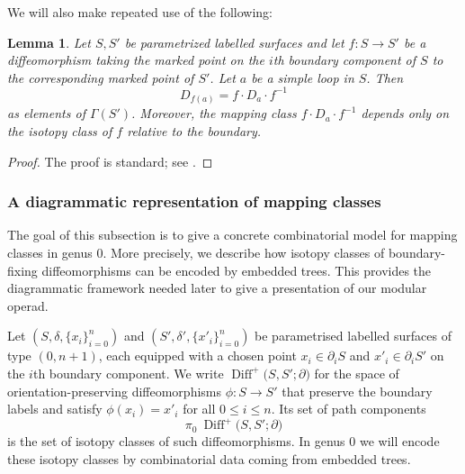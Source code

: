\documentclass{amsart}
\newcommand{\Diff}{\operatorname{Diff}}
\newtheorem{lemma}[theorem]{Lemma}%
\theoremstyle{definition}
\numberwithin{equation}{section}
\begin{document}
We will also make repeated use of the following:
\begin{lemma}\label{lemma: conjugation by mapping classes}
    Let $S,S'$ be parametrized labelled surfaces and let $f:S\to S'$ be a diffeomorphism taking the marked point on the $i$th boundary component of $S$ to the corresponding marked point of $S'$. Let $a$ be a simple loop in $S$. Then
    \[ D_{f(a)} = f\cdot D_a\cdot f^{-1} \]
    as elements of $\Gamma(S')$. Moreover, the mapping class $f\cdot D_a\cdot f^{-1}$ depends only on the isotopy class of $f$ relative to the boundary.
\end{lemma}

\begin{proof}
    The proof is standard; see \cite[Fact~3.7]{farb-marg}.
\end{proof}

\subsubsection{A diagrammatic representation of mapping classes}\label{subsubsec: diagrammatical representation of mapping classes} 
The goal of this subsection is to give a concrete combinatorial model for mapping classes in genus $0$. More precisely, we describe how isotopy classes of boundary-fixing diffeomorphisms can be encoded by embedded trees. This provides the diagrammatic framework needed later to give a presentation of our modular operad.


Let $(S,\delta,\{x_i\}_{i=0}^{n})$ and $(S',\delta',\{x'_i\}_{i=0}^{n})$ be parametrised labelled surfaces of type $(0,n+1)$, each equipped with a chosen point $x_i\in \partial_i S$ and $x'_i\in \partial_i S'$ on the $i$th boundary component. We write $\Diff^+\bigl(S,S'; \partial \bigr)$ for the space of
orientation-preserving diffeomorphisms $\phi:S\to S'$ that preserve the boundary labels and satisfy $\phi(x_i)=x'_i$ for all $0\le i\le n$. Its set of path components
\[
\pi_0\ \Diff^+\bigl(S,S'; \partial \bigr)
\]
is the set of isotopy classes of such diffeomorphisms. In genus $0$ we will encode these isotopy classes by combinatorial data coming from embedded trees.
\end{document}

